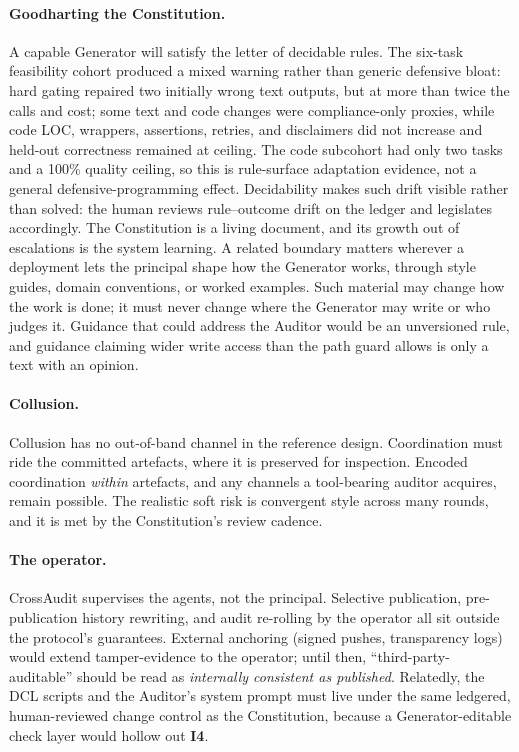 \documentclass[11pt]{article}
\newcommand{\invariant}[1]{\textbf{I#1}}
\begin{document}
\paragraph{Goodharting the Constitution.} A capable Generator will satisfy the letter of decidable rules. The six-task feasibility cohort produced a mixed warning rather than generic defensive bloat: hard gating repaired two initially wrong text outputs, but at more than twice the calls and cost; some text and code changes were compliance-only proxies, while code LOC, wrappers, assertions, retries, and disclaimers did not increase and held-out correctness remained at ceiling. The code subcohort had only two tasks and a 100\% quality ceiling, so this is rule-surface adaptation evidence, not a general defensive-programming effect. Decidability makes such drift visible rather than solved: the human reviews rule--outcome drift on the ledger and legislates accordingly. The Constitution is a living document, and its growth out of escalations is the system learning. A related boundary matters wherever a deployment lets the principal shape how the Generator works, through style guides, domain conventions, or worked examples. Such material may change how the work is done; it must never change where the Generator may write or who judges it. Guidance that could address the Auditor would be an unversioned rule, and guidance claiming wider write access than the path guard allows is only a text with an opinion.

\paragraph{Collusion.} Collusion has no out-of-band channel in the reference design. Coordination must ride the committed artefacts, where it is preserved for inspection. Encoded coordination \emph{within} artefacts, and any channels a tool-bearing auditor acquires, remain possible. The realistic soft risk is convergent style across many rounds, and it is met by the Constitution's review cadence.

\paragraph{The operator.} CrossAudit supervises the agents, not the principal. Selective publication, pre-publication history rewriting, and audit re-rolling by the operator all sit outside the protocol's guarantees. External anchoring (signed pushes, transparency logs) would extend tamper-evidence to the operator; until then, ``third-party-auditable'' should be read as \emph{internally consistent as published}. Relatedly, the DCL scripts and the Auditor's system prompt must live under the same ledgered, human-reviewed change control as the Constitution, because a Generator-editable check layer would hollow out \invariant{4}.
\end{document}
